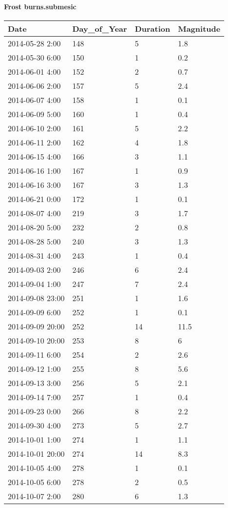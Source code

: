 \documentclass[
]{article}
\begin{document}
\hypertarget{frost-burns.submesic}{%
\paragraph{Frost burns.submesic}\label{frost-burns.submesic}}

\begin{tabular}{l|l|l|l}
\hline
Date & Day\_of\_Year & Duration & Magnitude\\
\hline
2014-05-28 2:00 & 148 & 5 & 1.8\\
\hline
2014-05-30 6:00 & 150 & 1 & 0.2\\
\hline
2014-06-01 4:00 & 152 & 2 & 0.7\\
\hline
2014-06-06 2:00 & 157 & 5 & 2.4\\
\hline
2014-06-07 4:00 & 158 & 1 & 0.1\\
\hline
2014-06-09 5:00 & 160 & 1 & 0.4\\
\hline
2014-06-10 2:00 & 161 & 5 & 2.2\\
\hline
2014-06-11 2:00 & 162 & 4 & 1.8\\
\hline
2014-06-15 4:00 & 166 & 3 & 1.1\\
\hline
2014-06-16 1:00 & 167 & 1 & 0.9\\
\hline
2014-06-16 3:00 & 167 & 3 & 1.3\\
\hline
2014-06-21 0:00 & 172 & 1 & 0.1\\
\hline
2014-08-07 4:00 & 219 & 3 & 1.7\\
\hline
2014-08-20 5:00 & 232 & 2 & 0.8\\
\hline
2014-08-28 5:00 & 240 & 3 & 1.3\\
\hline
2014-08-31 4:00 & 243 & 1 & 0.4\\
\hline
2014-09-03 2:00 & 246 & 6 & 2.4\\
\hline
2014-09-04 1:00 & 247 & 7 & 2.4\\
\hline
2014-09-08 23:00 & 251 & 1 & 1.6\\
\hline
2014-09-09 6:00 & 252 & 1 & 0.1\\
\hline
2014-09-09 20:00 & 252 & 14 & 11.5\\
\hline
2014-09-10 20:00 & 253 & 8 & 6\\
\hline
2014-09-11 6:00 & 254 & 2 & 2.6\\
\hline
2014-09-12 1:00 & 255 & 8 & 5.6\\
\hline
2014-09-13 3:00 & 256 & 5 & 2.1\\
\hline
2014-09-14 7:00 & 257 & 1 & 0.4\\
\hline
2014-09-23 0:00 & 266 & 8 & 2.2\\
\hline
2014-09-30 4:00 & 273 & 5 & 2.7\\
\hline
2014-10-01 1:00 & 274 & 1 & 1.1\\
\hline
2014-10-01 20:00 & 274 & 14 & 8.3\\
\hline
2014-10-05 4:00 & 278 & 1 & 0.1\\
\hline
2014-10-05 6:00 & 278 & 2 & 0.5\\
\hline
2014-10-07 2:00 & 280 & 6 & 1.3\\
\hline
\end{tabular}
\end{document}
